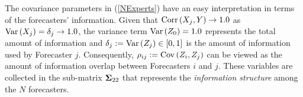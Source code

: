\documentclass[11pt]{article}
\newcommand{\R}{\mathbb{R}}
\theoremstyle{definition}
\theoremstyle{definition}
\def\bSigma{{\bf \Sigma}}
\def\Var{{\rm Var}\,}
\def\Cov{{\rm Cov}\,}
\def\Corr{{\rm Corr}\,}
\begin{document}
The covariance parameters in (\ref{NExperts}) have an easy interpretation in terms of the forecasters' information. Given that $\Corr(X_j, Y) \to 1.0$ as $\Var(X_j) = \delta_j \to 1.0$, the variance term $\Var(Z_0) = 1.0$ represents the total amount of information and $\delta_j := \Var(Z_j) \in [0,1]$ is the amount of information used by Forecaster $j$.  Consequently, $\rho_{ij} := \Cov (Z_{i} , Z_{j})$ can be viewed as the amount of information overlap between Forecasters $i$ and
$j$. These variables are collected in the sub-matrix $\bSigma_{22}$ that represents the \textit{information structure} among the $N$ forecasters. 





%
\end{document}
